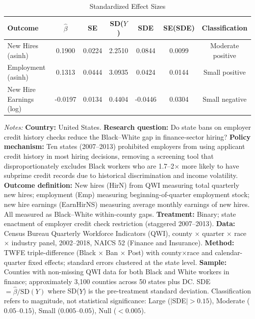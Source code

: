 \begin{table}[htbp]
\centering
\caption{Standardized Effect Sizes}
\label{tab:sde}
\small
\begin{tabular}{lcccccc}
\toprule
Outcome & $\hat{\beta}$ & SE & SD($Y$) & SDE & SE(SDE) & Classification \\
\midrule
New Hires (asinh) & 0.1900 & 0.0224 & 2.2510 & 0.0844 & 0.0099 & Moderate positive \\
Employment (asinh) & 0.1313 & 0.0444 & 3.0935 & 0.0424 & 0.0144 & Small positive \\
New Hire Earnings (log) & -0.0197 & 0.0134 & 0.4404 & -0.0446 & 0.0304 & Small negative \\
\bottomrule
\end{tabular}
\begin{tablenotes}
\footnotesize
\item \textit{Notes:} \textbf{Country:} United States. \textbf{Research question:} Do state bans on employer credit history checks reduce the Black--White gap in finance-sector hiring? \textbf{Policy mechanism:} Ten states (2007--2013) prohibited employers from using applicant credit history in most hiring decisions, removing a screening tool that disproportionately excludes Black workers who are 1.7--2$\times$ more likely to have subprime credit records due to historical discrimination and income volatility. \textbf{Outcome definition:} New hires (HirN) from QWI measuring total quarterly new hires; employment (Emp) measuring beginning-of-quarter employment stock; new hire earnings (EarnHirNS) measuring average monthly earnings of new hires. All measured as Black--White within-county gaps. \textbf{Treatment:} Binary; state enactment of employer credit check restriction (staggered 2007--2013). \textbf{Data:} Census Bureau Quarterly Workforce Indicators (QWI), county $\times$ quarter $\times$ race $\times$ industry panel, 2002--2018, NAICS 52 (Finance and Insurance). \textbf{Method:} TWFE triple-difference (Black $\times$ Ban $\times$ Post) with county$\times$race and calendar-quarter fixed effects; standard errors clustered at the state level. \textbf{Sample:} Counties with non-missing QWI data for both Black and White workers in finance; approximately 3,100 counties across 50 states plus DC. SDE $= \hat{\beta} / \text{SD}(Y)$ where SD($Y$) is the pre-treatment standard deviation. Classification refers to magnitude, not statistical significance: Large ($|$SDE$| > 0.15$), Moderate ($0.05$--$0.15$), Small ($0.005$--$0.05$), Null ($< 0.005$).
\end{tablenotes}
\end{table}
